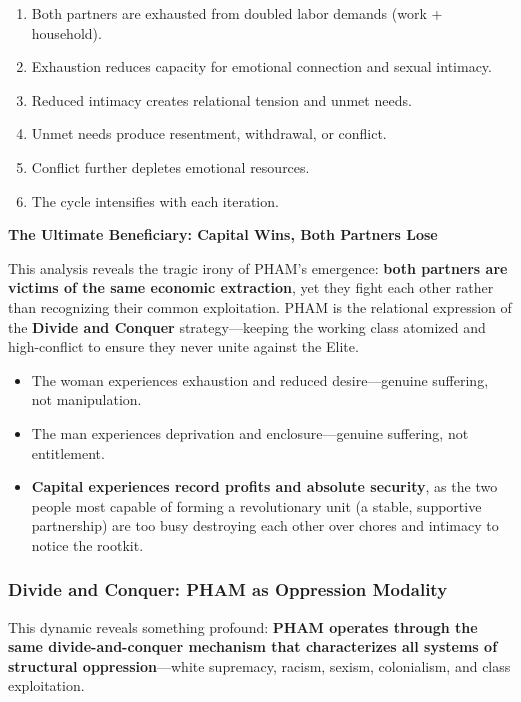 \documentclass[12pt, letterpaper]{article}
\begin{document}
\begin{enumerate}
    \item Both partners are exhausted from doubled labor demands (work + household).
    \item Exhaustion reduces capacity for emotional connection and sexual intimacy.
    \item Reduced intimacy creates relational tension and unmet needs.
    \item Unmet needs produce resentment, withdrawal, or conflict.
    \item Conflict further depletes emotional resources.
    \item The cycle intensifies with each iteration.
\end{enumerate}

\textbf{The Ultimate Beneficiary: Capital Wins, Both Partners Lose}

This analysis reveals the tragic irony of PHAM's emergence: \textbf{both partners are victims of the same economic extraction}, yet they fight each other rather than recognizing their common exploitation. PHAM is the relational expression of the \textbf{Divide and Conquer} strategy---keeping the working class atomized and high-conflict to ensure they never unite against the Elite.

\begin{itemize}
    \item The woman experiences exhaustion and reduced desire---genuine suffering, not manipulation.
    \item The man experiences deprivation and enclosure---genuine suffering, not entitlement.
    \item \textbf{Capital experiences record profits and absolute security}, as the two people most capable of forming a revolutionary unit (a stable, supportive partnership) are too busy destroying each other over chores and intimacy to notice the rootkit.
\end{itemize}

\subsubsection{Divide and Conquer: PHAM as Oppression Modality}

This dynamic reveals something profound: \textbf{PHAM operates through the same divide-and-conquer mechanism that characterizes all systems of structural oppression}---white supremacy, racism, sexism, colonialism, and class exploitation.
\end{document}
